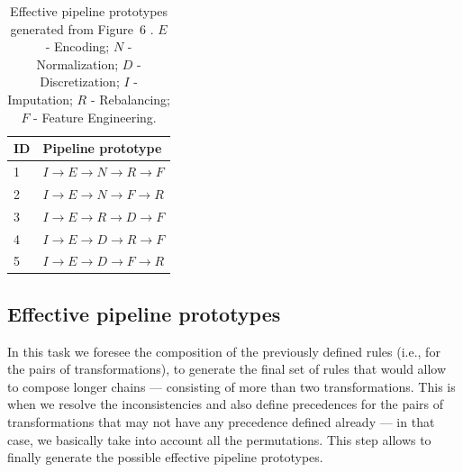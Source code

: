 \begin{example}
\begin{table}[t]
	\caption{Effective pipeline prototypes generated from Figure~6%
	. $E$ - Encoding; $N$ - Normalization; $D$ - Discretization; $I$ - Imputation; $R$ - Rebalancing; $F$ - Feature Engineering.
	}
	\footnotesize
	\label{tbl:effective-pipelines}
	\begin{center}
		\begin{tabular}{@{}ll}
			\toprule
			ID& Pipeline prototype                                             \\ \toprule
			1&{\color[HTML]{000000} $I\rightarrow E\rightarrow N \rightarrow R\rightarrow F$} \\
			2&{\color[HTML]{000000} $I\rightarrow E\rightarrow N \rightarrow F\rightarrow R$} \\
			3&{\color[HTML]{000000} $I\rightarrow E\rightarrow R \rightarrow D\rightarrow F$} \\
			4&{\color[HTML]{000000} $I\rightarrow E\rightarrow D \rightarrow R\rightarrow F$} \\
			5&{\color[HTML]{000000} $I\rightarrow E\rightarrow D \rightarrow F\rightarrow R$} \\
			\bottomrule
		\end{tabular}
	\end{center}
\end{table}
\fi

\end{example}

\subsection{Effective pipeline prototypes}
\label{effective-ssec:composition}
In this task we foresee the composition of the previously defined rules (i.e., for the pairs of transformations), to generate the final set of rules that would allow to compose longer chains --- consisting of more than two transformations. This is when we resolve the inconsistencies and also define precedences for the pairs of transformations that may not have any precedence defined already --- in that case, we basically take into account all the permutations. This step allows to finally generate the possible effective pipeline prototypes. 

